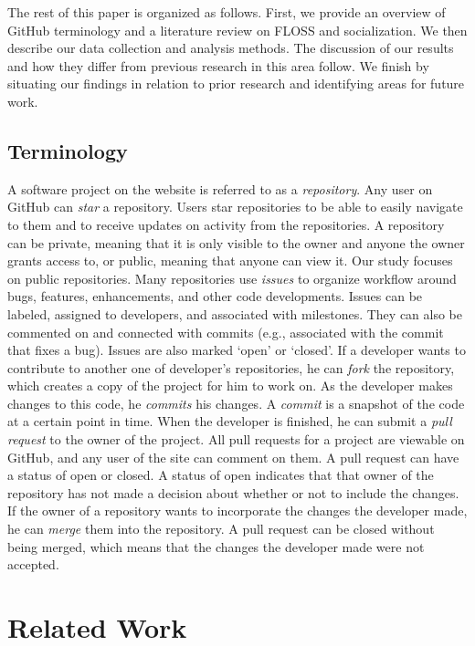 \documentclass{sigchi}
\begin{document}
The rest of this paper is organized as follows. First, we provide an overview of
GitHub terminology and a literature review on FLOSS and socialization. We then
describe our data collection and analysis methods. The discussion of our results
and how they differ from previous research in this area follow. We finish by
situating our findings in relation to prior research and identifying areas for
future work.


\subsection{Terminology} \label{sec:terms}

A software project on the website is referred to as a \textit{repository}. Any
user on GitHub can \textit{star} a repository. Users star repositories to be
able to easily navigate to them and to receive updates on activity from the
repositories. A repository can be private, meaning that it is only visible to
the owner and anyone the owner grants access to, or public, meaning that anyone
can view it. Our study focuses on public repositories. Many repositories use
\textit{issues} to organize workflow around bugs, features, enhancements, and
other code developments. Issues can be labeled, assigned to developers, and
associated with milestones. They can also be commented on and connected with
commits (e.g., associated with the commit that fixes a bug). Issues are also
marked `open' or `closed'. If a developer wants to contribute to another one of
developer's repositories, he can \textit{fork} the repository, which creates a
copy of the project for him to work on. As the developer makes changes to this
code, he \textit{commits} his changes. A \textit{commit} is a snapshot of the
code at a certain point in time. When the developer is finished, he can submit a
\textit{pull request} to the owner of the project. All pull requests for a
project are viewable on GitHub, and any user of the site can comment on them. A
pull request can have a status of open or closed. A status of open indicates
that that owner of the repository has not made a decision about whether or not
to include the changes. If the owner of a repository wants to incorporate the
changes the developer made, he can \textit{merge} them into the repository. A
pull request can be closed without being merged, which means that the changes
the developer made were not accepted.

\section{Related Work} \label{sec:relatedwork}
\end{document}
